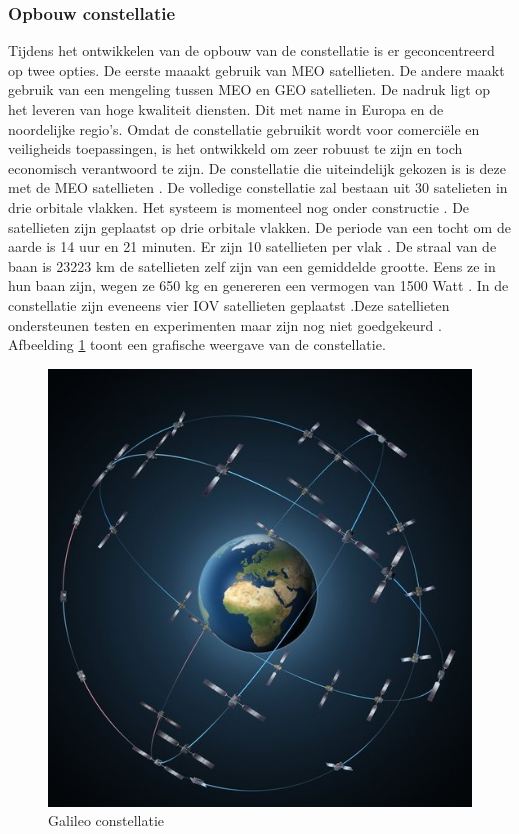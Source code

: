 \subsubsection{Opbouw constellatie}
Tijdens het ontwikkelen van de opbouw van de constellatie is er geconcentreerd op twee opties. De eerste maaakt gebruik van MEO satellieten. De andere maakt gebruik van een mengeling tussen MEO en GEO satellieten. De nadruk ligt op het leveren van hoge kwaliteit diensten. Dit met name in Europa en de noordelijke regio's. Omdat de constellatie gebruikit wordt voor comerci\"ele en veiligheids toepassingen, is het ontwikkeld om zeer robuust te zijn en toch economisch verantwoord te zijn.  De constellatie die uiteindelijk gekozen is is deze met de MEO satellieten \cite{LBibGalileo2}. De volledige constellatie zal bestaan  uit 30 satelieten in drie orbitale vlakken. Het systeem is momenteel nog onder constructie \cite{LBibGNSS4}. De satellieten zijn geplaatst op drie orbitale vlakken. De periode van een tocht om de aarde is 14 uur en 21 minuten. Er zijn 10 satellieten per vlak \cite{LBibGNSS6}. De straal van de baan is 23223 km de satellieten zelf zijn van een gemiddelde grootte. Eens ze in hun baan zijn, wegen ze 650 kg en genereren een vermogen van 1500 Watt \cite{LBibGalileo2}. In de constellatie zijn eveneens vier IOV satellieten geplaatst \cite{LBibBeiDou3,LBibPPP2}.Deze satellieten ondersteunen testen en experimenten maar zijn nog niet goedgekeurd \cite{LBibGNSS9}. Afbeelding \ref{imgGalileo} toont een grafische weergave van de constellatie.

\begin{figure}[hpb]
	\includegraphics[scale=1.75]{Galileo.jpg}
	\caption{Galileo constellatie \cite{LImgGalileo}}
	\label{imgGalileo}
\end{figure} 

